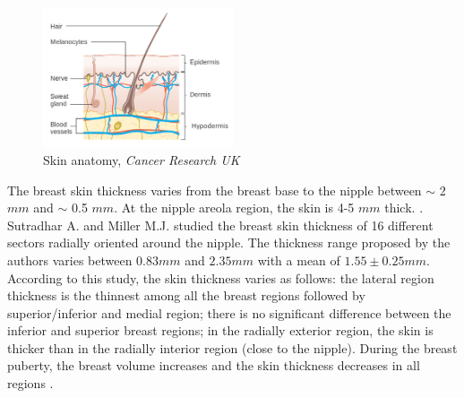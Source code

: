 \begin{figure}[!h]
\centering
\centerline{\includegraphics[width=0.5\textwidth,keepaspectratio]{figures/skin_2.jpg} }
\caption{Skin anatomy, \textit{Cancer Research UK}}
\label{fig:skinanatomy}
\end{figure}



The breast skin thickness varies from the breast base to the nipple between $\sim$ 2 $mm$ and $\sim$ 0.5 $mm$. At the nipple areola region, the skin is 4-5 $mm$ thick.
 \citep{andolina2011mammographic}. Sutradhar A. and Miller M.J. \citep{sutradhar_vivo_2013} studied the breast skin thickness of 16 different sectors radially oriented around the nipple. The thickness range proposed by the authors varies between $0.83 mm$ and $2.35 mm$ with a mean of $1.55 \pm 0.25 mm$. According to this study, the skin thickness varies as follows: the lateral
region thickness is the thinnest among all the breast regions followed by superior/inferior and medial region; there is no significant difference between the inferior and superior breast regions; in the radially exterior region, the skin is thicker than in the radially interior region (close to the nipple).  During the breast puberty, the breast volume increases and the skin thickness decreases in all regions \citep{ulger2003effect}.

